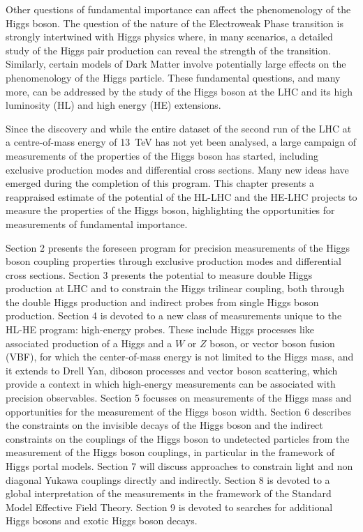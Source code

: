 \documentclass[../report.tex]{subfiles}
\begin{document}
Other questions of fundamental importance can affect the phenomenology
of the Higgs boson.  The question of the nature of the Electroweak Phase transition is strongly intertwined with Higgs physics where, in many scenarios, a detailed study of the Higgs pair production can reveal the strength of the transition.
Similarly, certain models of Dark Matter involve
potentially large effects on the phenomenology of the Higgs
particle.
These fundamental questions, and many more, can be addressed by the study of the
Higgs boson at the LHC and its high luminosity (HL) and high energy
(HE) extensions.



Since the discovery and while the entire dataset of the second run of
the LHC at a centre-of-mass energy of 13~TeV has not yet been
analysed, a large campaign of measurements of the properties of the
Higgs boson has started, including exclusive production modes and
differential cross sections. Many new ideas have emerged during the
completion of this program. This chapter presents a reappraised
estimate of the potential of the HL-LHC and the HE-LHC projects to
measure the properties of the Higgs boson, highlighting the
opportunities for measurements of fundamental importance.

Section 2 presents the foreseen program for precision measurements of
the Higgs boson coupling properties through exclusive production modes
and differential cross sections. Section 3 presents the potential to
measure double Higgs production at LHC and to constrain the Higgs
trilinear coupling, both through the double Higgs production and
indirect probes from single Higgs boson production. Section 4 is
devoted to a new class of measurements unique to the HL-HE program:
high-energy probes. These include Higgs processes like  associated production  of a Higgs and a $W$ or $Z$ boson,  or vector boson fusion (VBF), for which the center-of-mass energy is not limited to the Higgs mass, and it extends to
Drell Yan, diboson processes and vector
boson scattering, which provide a context in which high-energy measurements can be associated with 
 precision observables. Section 5 focusses on measurements of the
Higgs mass and opportunities for the measurement of the Higgs boson
width. Section 6 describes the constraints on the invisible decays of
the Higgs boson and the indirect constraints on the couplings of the
Higgs boson to undetected particles from the measurement of the Higgs
boson couplings, in particular in the framework of Higgs portal
models. Section 7 will discuss approaches to constrain light and non
diagonal Yukawa couplings directly and indirectly. Section 8 is
devoted to a global interpretation of the measurements in the
framework of the Standard Model Effective Field Theory. Section 9 is
devoted to searches for additional Higgs bosons and exotic Higgs boson
decays.
\end{document}
